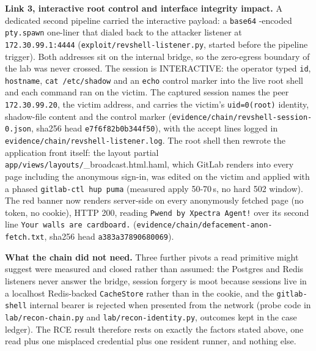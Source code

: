 \documentclass[journal]{IEEEtran}
\begin{document}
\textbf{Link 3, interactive root control and interface integrity impact.} A
dedicated second pipeline carried the interactive payload: a \texttt{base64}
-encoded \texttt{pty.spawn} one-liner that dialed back to the attacker
listener at \texttt{172.30.99.1:4444}
(\texttt{exploit/revshell-listener.py}, started before the pipeline trigger).
Both addresses sit on the internal bridge, so the zero-egress boundary of the
lab was never crossed. The session is INTERACTIVE: the operator typed
\texttt{id}, \texttt{hostname}, \texttt{cat\ /etc/shadow} and an \texttt{echo}
control marker into the live
root shell and each command ran on the victim. The captured session names the
peer \texttt{172.30.99.20}, the victim address, and carries the victim's
\texttt{uid=0(root)} identity, shadow-file content and the control marker
(\texttt{evidence/chain/}\hspace{0pt}\texttt{revshell-session-0.json}, sha256
head \texttt{e7f6f82b0b344f50}),
with the accept lines logged in \texttt{evidence/chain/revshell-listener.log}.
The root shell then rewrote the application front itself: the layout partial
\texttt{app/views/layouts/}\_broadcast.html.haml, which GitLab renders into
every page including the anonymous sign-in, was edited on the victim and
applied with a phased \texttt{gitlab-ctl hup puma} (measured apply 50-70\,s,
no hard 502 window). The red banner now renders server-side on every
anonymously fetched page (no token, no cookie), HTTP 200, reading
\texttt{Pwend\ by\ Xpectra\ Agent!} over its second line \texttt{Your\ walls\
are\ cardboard.}
(\texttt{evidence/}\hspace{0pt}\texttt{chain/defacement-anon-fetch.txt},
sha256 head \texttt{a383a37890680069}).

\textbf{What the chain did not need.} Three further pivots a read primitive
might suggest were measured and closed rather than assumed: the Postgres and
Redis listeners never answer the bridge, session forgery is moot because
sessions live in a localhost Redis-backed \texttt{CacheStore} rather than in
the cookie, and the \texttt{gitlab-shell} internal bearer is rejected when
presented from the network (probe code in \texttt{lab/recon-chain.py} and
\texttt{lab/recon-identity.py}, outcomes kept in the case ledger). The RCE
result therefore rests on exactly the
factors stated above, one read plus one misplaced credential plus one resident
runner, and nothing else.
\end{document}
